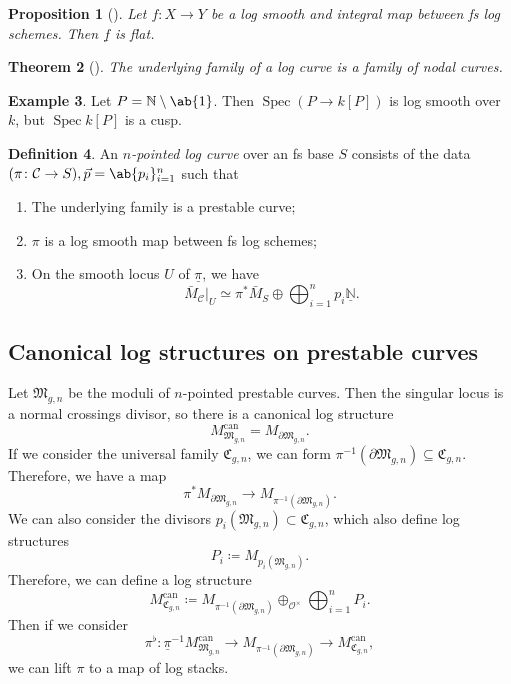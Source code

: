 \documentclass{amsart}
\newtheorem{thm}{Theorem}[section]
\newtheorem{prop}[thm]{Proposition}
\theoremstyle{definition}
\newtheorem{defn}[thm]{Definition}
\newtheorem{exm}[thm]{Example}
\theoremstyle{remark}
\theoremstyle{plain}
\theoremstyle{definition}
\theoremstyle{remark}
\newcommand{\N}{\mathbb{N}}
\newcommand{\mc}[1]{\mathcal{#1}}
\newcommand{\mf}[1]{\mathfrak{#1}}
\newcommand{\on}[1]{\operatorname{#1}}
\newcommand{\ul}[1]{\underline{#1}}
\newcommand{\1}{\mathbf{1}}
\newcommand{\2}{\mathbf{2}}
\newcommand{\3}{\mathbf{3}}
\DeclareMathOperator{\Spec}{Spec}
\begin{document}
\begin{prop}[{\cite{Kato1989}}]
    Let \(f \colon X \to Y\) be a log smooth and integral map between fs log schemes. Then \(\ul{f}\) is flat.
\end{prop}

\begin{thm}[{\cite{FKato2000}}]
    The underlying family of a log curve is a family of nodal curves.
\end{thm}

\begin{exm}
    Let \(P = \N \setminus \ab\{1\}\). Then \(\Spec (P \to k[P])\) is log smooth over \(k\), but \(\Spec k[P]\) is a cusp.
\end{exm}

\begin{defn}
    An \textit{\(n\)-pointed log curve} over an fs base \(S\) consists of the data \((\pi \colon \mc{C} \to S), \vec{p} = \ab\{p_i\}_{i=1}^n\) such that
    \begin{enumerate}
        \item The underlying family is a prestable curve;
        \item \(\pi\) is a log smooth map between fs log schemes;
        \item On the smooth locus \(U\) of \(\ul{\pi}\), we have
            \[ \bar{M}_{\mc{C}}|_U \simeq \pi^* \bar{M}_S \oplus \bigoplus_{i=1}^n p_i \ul{\N}. \]
    \end{enumerate}
\end{defn}

\subsection{Canonical log structures on prestable curves}%
\label{sub:Canonical log structures on prestable curves}

Let \(\mf{M}_{g,n}\) be the moduli of \(n\)-pointed prestable curves. Then the singular locus is a normal crossings divisor, so there is a canonical log structure
\[ M_{\mf{M}_{g,n}}^{\on{can}} = M_{\partial \mf{M}_{g,n}}. \]
If we consider the universal family \(\mf{C}_{g,n}\), we can form \(\pi^{-1}(\partial \mf{M}_{g,n}) \subseteq \mf{C}_{g,n}\). Therefore, we have a map
\[ \pi^* M_{\partial \mf{M}_{g,n}} \to M_{\pi^{-1}(\partial \mf{M}_{g,n})}. \]
We can also consider the divisors \(p_i(\mf{M}_{g,n}) \subset \mf{C}_{g,n}\), which also define log structures
\[ P_i \coloneqq M_{p_i(\mf{M}_{g,n})}. \]
Therefore, we can define a log structure
\[ M_{\mf{C}_{g,n}}^{\on{can}} \coloneqq M_{\pi^{-1}(\partial\mf{M}_{g,n})} \oplus_{\mc{O}^{\times}} \bigoplus_{i=1}^n P_i. \]
Then if we consider
\[ \pi^{\flat} \colon \ul{\pi}^{-1} M_{\mf{M}_{g,n}}^{\on{can}} \to M_{\pi^{-1}(\partial \mf{M}_{g,n})} \to M_{\mf{C}_{g,n}}^{\on{can}}, \]
we can lift \(\pi\) to a map of log stacks.
\end{document}
